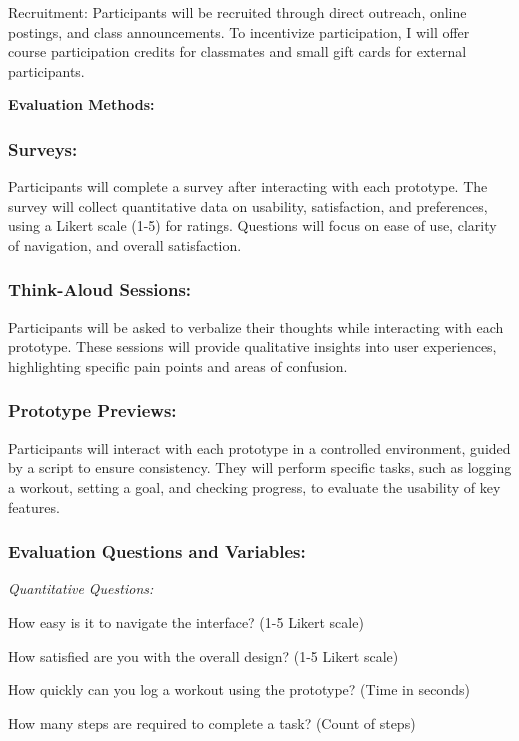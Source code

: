 \documentclass[
	letterpaper, %
]{jdf}
\begin{document}
Recruitment: Participants will be recruited through direct outreach, online postings, and class announcements. To incentivize participation, I will offer course participation credits for classmates and small gift cards for external participants.

\textbf{Evaluation Methods:}
\subsubsection{Surveys:} 

Participants will complete a survey after interacting with each prototype. The survey will collect quantitative data on usability, satisfaction, and preferences, using a Likert scale (1-5) for ratings. Questions will focus on ease of use, clarity of navigation, and overall satisfaction.

\subsubsection{Think-Aloud Sessions:}

Participants will be asked to verbalize their thoughts while interacting with each prototype. These sessions will provide qualitative insights into user experiences, highlighting specific pain points and areas of confusion.

\subsubsection{Prototype Previews:}

Participants will interact with each prototype in a controlled environment, guided by a script to ensure consistency. They will perform specific tasks, such as logging a workout, setting a goal, and checking progress, to evaluate the usability of key features.

\subsubsection{Evaluation Questions and Variables:}
\textit{Quantitative Questions:}

How easy is it to navigate the interface? (1-5 Likert scale)

How satisfied are you with the overall design? (1-5 Likert scale)

How quickly can you log a workout using the prototype? (Time in seconds)

How many steps are required to complete a task? (Count of steps)
\end{document}
